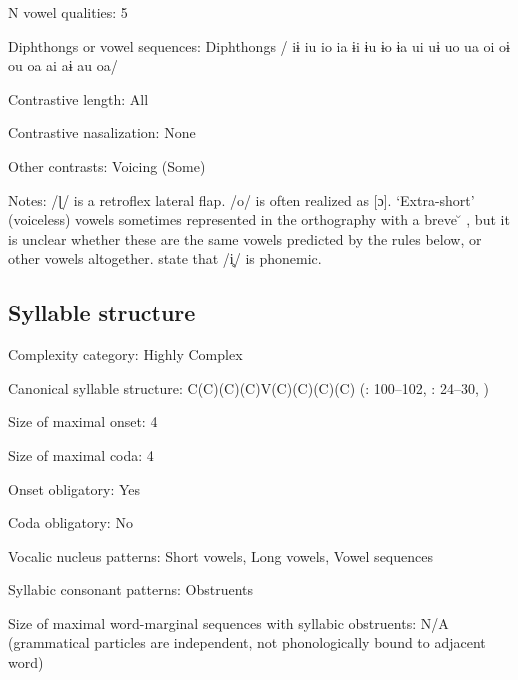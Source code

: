 {\begin{appendixdesc}
\item[N vowel qualities:] 5

\item[Diphthongs or vowel sequences:] Diphthongs / iɨ iu io ia ɨi ɨu ɨo ɨa ui uɨ uo ua oi oɨ ou oa ai aɨ au oa/

\item[Contrastive length:] All

\item[Contrastive nasalization:] None

\item[Other contrasts:] Voicing (Some)

\item[Notes:] /ɭ/ is a retroflex lateral flap. /o/ is often realized as [ɔ]. ‘Extra-short’ (voiceless) vowels sometimes represented in the orthography with a breve  \u{} , but it is unclear whether these are the same vowels predicted by the rules below, or other vowels altogether.   \citet[236]{DoloresMathiot1991} state that /i̥/ is phonemic.
\end{appendixdesc}
\subsection*{Syllable structure}
\begin{appendixdesc}

\item[Complexity category:] Highly Complex

\item[Canonical syllable structure:] C(C)(C)(C)V(C)(C)(C)(C) (\citealt{Saxton1982}: 100--102, \citealt{Hale1959}: 24--30, \citealt{HillZepeda1992})

\item[Size of maximal onset:] 4

\item[Size of maximal coda:] 4

\item[Onset obligatory:] Yes

\item[Coda obligatory:] No

\item[Vocalic nucleus patterns:] Short vowels, Long vowels, Vowel sequences

\item[Syllabic consonant patterns:] Obstruents

\item[Size of maximal word-marginal sequences with syllabic obstruents:] N/A (grammatical particles are independent, not phonologically bound to adjacent word)


\end{appendixdesc}}
